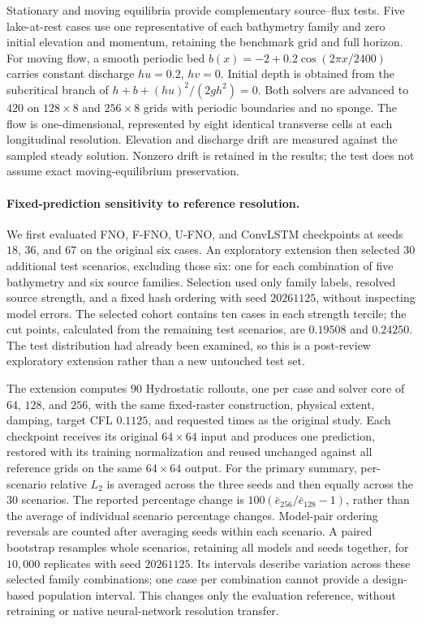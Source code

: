 Stationary and moving equilibria provide complementary source--flux tests. Five lake-at-rest cases use one representative of each bathymetry family and zero initial elevation and momentum, retaining the benchmark grid and full horizon. For moving flow, a smooth periodic bed $b(x) = -2 + 0.2 \cos(2\pi x/2400)$ carries constant discharge $hu = 0.2$, $hv = 0$. Initial depth is obtained from the subcritical branch of $h + b + (hu) ^ 2 / (2gh ^ 2)=0$. Both solvers are advanced to $420$ on $128 \times 8$ and $256 \times 8$ grids with periodic boundaries and no sponge. The flow is one-dimensional, represented by eight identical transverse cells at each longitudinal resolution. Elevation and discharge drift are measured against the sampled steady solution. Nonzero drift is retained in the results; the test does not assume exact moving-equilibrium preservation.

\paragraph{Fixed-prediction sensitivity to reference resolution.}
We first evaluated FNO, F-FNO, U-FNO, and ConvLSTM checkpoints at seeds $18$, $36$, and $67$ on the original six cases. An exploratory extension then selected $30$ additional test scenarios, excluding those six: one for each combination of five bathymetry and six source families. Selection used only family labels, resolved source strength, and a fixed hash ordering with seed $20261125$, without inspecting model errors. The selected cohort contains ten cases in each strength tercile; the cut points, calculated from the remaining test scenarios, are $0.19508$ and $0.24250$. The test distribution had already been examined, so this is a post-review exploratory extension rather than a new untouched test set.

The extension computes $90$ Hydrostatic rollouts, one per case and solver core of $64$, $128$, and $256$, with the same fixed-raster construction, physical extent, damping, target CFL $0.1125$, and requested times as the original study. Each checkpoint receives its original $64\times64$ input and produces one prediction, restored with its training normalization and reused unchanged against all reference grids on the same $64\times64$ output. For the primary summary, per-scenario relative $L_2$ is averaged across the three seeds and then equally across the $30$ scenarios. The reported percentage change is $100(\bar e_{256}/\bar e_{128}-1)$, rather than the average of individual scenario percentage changes. Model-pair ordering reversals are counted after averaging seeds within each scenario. A paired bootstrap resamples whole scenarios, retaining all models and seeds together, for $10{,}000$ replicates with seed $20261125$. Its intervals describe variation across these selected family combinations; one case per combination cannot provide a design-based population interval. This changes only the evaluation reference, without retraining or native neural-network resolution transfer.

